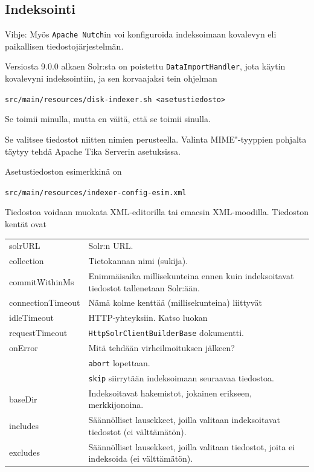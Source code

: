 \documentclass[12pt]{article}
\begin{document}
\newpage
\subsection*{Indeksointi}

Vihje: Myös \verb=Apache Nutch=in voi konfiguroida indeksoimaan
kovalevyn eli paikallisen tiedostojärjestelmän.


\bigskip
Versiosta 9.0.0 alkaen Solr:sta on poistettu \verb=DataImportHandler=,
jota käytin kovalevyni indeksointiin, ja sen korvaajaksi tein ohjelman

\verb=src/main/resources/disk-indexer.sh <asetustiedosto>=

Se toimii minulla, mutta en väitä, että se toimii sinulla.

Se valitsee tiedostot niitten nimien perusteella. Valinta
MIME"-tyyppien pohjalta täytyy tehdä Apache Tika Serverin asetuksissa.

Asetustiedoston esimerkkinä on

\verb|src/main/resources/indexer-config-esim.xml|

Tiedostoa voidaan muokata XML-editorilla tai emacsin XML-moodilla.
Tiedoston kentät ovat

\begin{tabularx}{\textwidth}{@{}lX}
solrURL           & Solr:n URL. \\
collection        & Tietokannan nimi (sukija). \\
commitWithinMs    & Enimmäisaika millisekunteina ennen kuin indeksoitavat tiedostot tallenetaan Solr:ään. \\
connectionTimeout & Nämä kolme kenttää (millisekunteina) liittyvät \\
idleTimeout       & HTTP-yhteyksiin. Katso luokan \\
requestTimeout    & \texttt{HttpSolrClientBuilderBase} dokumentti. \\
onError           & Mitä tehdään virheilmoituksen jälkeen? \\
                  & \texttt{abort} lopettaan. \\
                  & \texttt{skip} siirrytään indeksoimaan seuraavaa tiedostoa. \\
baseDir           & Indeksoitavat hakemistot, jokainen erikseen, merkkijonoina. \\
includes          & Säännölliset lausekkeet, joilla valitaan indeksoitavat tiedostot (ei välttämätön).  \\
excludes          & Säännölliset lausekkeet, joilla valitaan tiedostot, joita ei indeksoida (ei välttämätön).
\end{tabularx}
\end{document}
